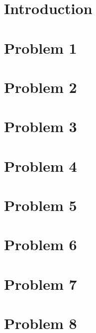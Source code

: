 \documentclass[11pt,a4paper,twoside,norsk]{article}
\begin{document}
\maketitle

\begin{abstract}
    
\end{abstract}

\section{Introduction}
\label{sec:introduction}


\section{Problem 1}


\section{Problem 2}


\section{Problem 3}


\section{Problem 4}


\section{Problem 5}


\section{Problem 6}


\section{Problem 7}


\section{Problem 8}

\end{document}
